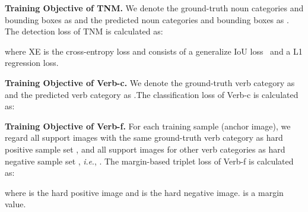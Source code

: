 \documentclass[letterpaper]{article} \usepackage{aaai22}  \usepackage{times}  \usepackage{helvet}  \usepackage{courier}  \usepackage[hyphens]{url}  \usepackage{graphicx} \urlstyle{rm} \def\UrlFont{\rm}  \usepackage{natbib}  \usepackage{caption} \DeclareCaptionStyle{ruled}{labelfont=normalfont,labelsep=colon,strut=off} \frenchspacing  \setlength{\pdfpagewidth}{8.5in}  \setlength{\pdfpageheight}{11in}
\newcommand{\ie}{\textit{i}.\textit{e}.}
\begin{document}
\noindent\textbf{Training Objective of TNM.}
We denote the ground-truth noun categories and bounding boxes as  and the predicted noun categories and bounding boxes as . The detection loss  of TNM is calculated as:

where XE is the cross-entropy loss and  consists of a generalize IoU loss~\cite{rezatofighi2019generalized} and a L1 regression loss.

\noindent\textbf{Training Objective of Verb-c.}
We denote the ground-truth verb category as  and the predicted verb category as .The classification loss of Verb-c  is calculated as:


\noindent\textbf{Training Objective of Verb-f.}
For each training sample  (anchor image), we regard all support images with the same ground-truth verb category as hard positive sample set , and all support images for other verb categories as hard negative sample set , \ie, . The margin-based triplet loss of Verb-f  is calculated as: 

where  is the hard positive image and   is the hard negative image.  is a margin value.
\end{document}

